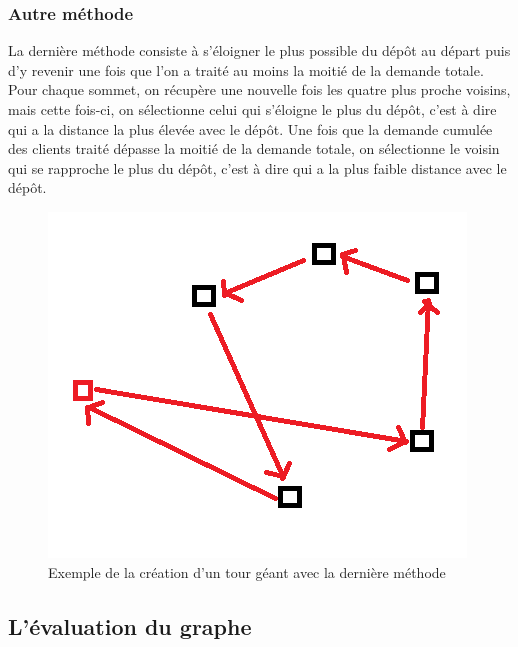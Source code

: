 \documentclass[12pt]{article}
\begin{document}
 \subsubsection{Autre méthode}
 La dernière méthode consiste à s'éloigner le plus possible du dépôt au départ puis d'y revenir une fois que l'on a traité au moins la moitié de la demande totale. Pour chaque sommet, on récupère une nouvelle fois les quatre plus proche voisins, mais cette fois-ci, on sélectionne celui qui s'éloigne le plus du dépôt, c'est à dire qui a la distance la plus élevée avec le dépôt. Une fois que la demande cumulée des clients traité dépasse la moitié de la demande totale, on sélectionne le voisin qui se rapproche le plus du dépôt, c'est à dire qui a la plus faible distance avec le dépôt.
 \begin{figure}[!h]
	    \centering
	    \includegraphics[scale = 1]{autre.png}
	    \caption{Exemple de la création d'un tour géant avec la dernière méthode}
	    \label{fig4}
	\end{figure}\par
  
	 \subsection{L'évaluation du graphe}
	 \hypertarget{eval}{}
\end{document}
